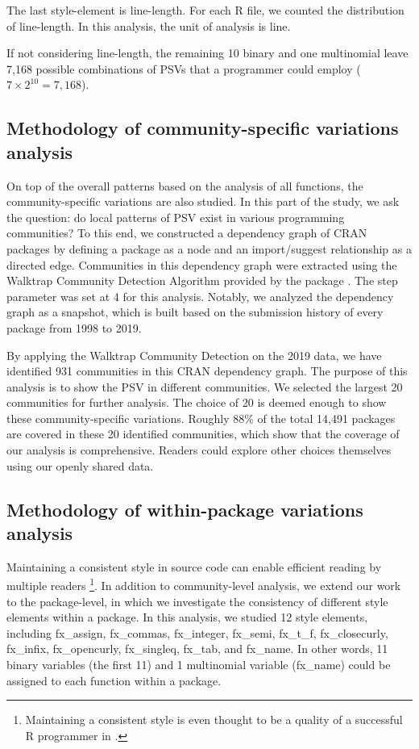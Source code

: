 The last style-element is line-length. For each R file, we counted the distribution of line-length. In this analysis, the unit of analysis is line.

If not considering line-length, the remaining 10 binary and one multinomial leave 7,168 possible combinations of PSVs that a programmer could employ ($7 \times 2^{10} = 7,168$).

\subsection{Methodology of community-specific variations analysis}

On top of the overall patterns based on the analysis of all functions, the community-specific variations are also studied. In this part of the study, we ask the question: do local patterns of PSV exist in various programming communities? To this end, we constructed a dependency graph of CRAN packages by defining a package as a node and an import/suggest relationship as a directed edge. Communities in this dependency graph were extracted using the Walktrap Community Detection Algorithm \citep{pons} provided by the  package \citep{csardi}. The step parameter was set at 4 for this analysis. Notably, we analyzed the dependency graph as a snapshot, which is built based on the submission history of every package from 1998 to 2019. 

By applying the Walktrap Community Detection on the 2019 data, we have identified 931 communities in this CRAN dependency graph. The purpose of this analysis is to show the PSV in different communities. We selected the largest 20 communities for further analysis. The choice of 20 is deemed enough to show these community-specific variations. Roughly 88\% of the total 14,491 packages are covered in these 20 identified communities, which show that the coverage of our analysis is comprehensive. Readers could explore other choices themselves using our openly shared data.  

\subsection{Methodology of within-package variations analysis}

Maintaining a consistent style in source code can enable efficient reading by multiple readers \citep{gillespie2016efficient} \footnote{Maintaining a consistent style is even thought to be a quality of a successful R programmer in \citet{gillespie2016efficient}.}. In addition to community-level analysis, we extend our work to the package-level, in which we investigate the consistency of different style elements within a package. In this analysis, we studied 12 style elements, including fx\_assign, fx\_commas, fx\_integer, fx\_semi, fx\_t\_f, fx\_closecurly, fx\_infix, fx\_opencurly, fx\_singleq, fx\_tab, and fx\_name.  In other words, 11 binary variables (the first 11) and 1 multinomial variable (fx\_name) could be assigned to each function within a package.

